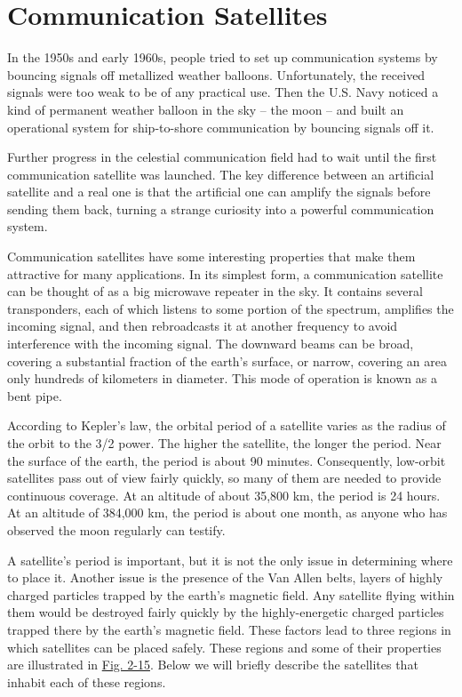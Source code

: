 \protect\hypertarget{0130661023_ch02lev1sec4.htmlux5cux23ch02lev1sec4}{}{}

\section{Communication Satellites}

In the 1950s and early 1960s, people tried to set up communication
systems by bouncing signals off metallized weather balloons.
Unfortunately, the received signals were too weak to be of any practical
use. Then the U.S. Navy noticed a kind of permanent weather balloon in
the sky -- the moon -- and built an operational system for ship-to-shore
communication by bouncing signals off it.

Further progress in the celestial communication field had to wait until
the first communication satellite was launched. The key difference
between an artificial satellite and a real one is that the artificial
one can amplify the signals before sending them back, turning a strange
curiosity into a powerful communication system.

Communication satellites have some interesting properties that make them
attractive for many applications. In its simplest form, a communication
satellite can be thought of as a big microwave repeater in the sky. It
contains several {transponders}, each of which listens to some portion
of the spectrum, amplifies the incoming signal, and then rebroadcasts it
at another frequency to avoid interference with the incoming signal. The
downward beams can be broad, covering a substantial fraction of the
earth's surface, or narrow, covering an area only hundreds of kilometers
in diameter. This mode of operation is known as a {bent pipe}.

According to Kepler's law, the orbital period of a satellite varies as
the radius of the orbit to the 3/2 power. The higher the satellite, the
longer the period. Near the surface of the earth, the period is about 90
minutes. Consequently, low-orbit satellites pass out of view fairly
quickly, so many of them are needed to provide continuous coverage. At
an altitude of about 35,800 km, the period is 24 hours. At an altitude
of 384,000 km, the period is about one month, as anyone who has observed
the moon regularly can testify.

A satellite's period is important, but it is not the only issue in
determining where to place it. Another issue is the presence of the Van
Allen belts, layers of highly charged particles trapped by the earth's
magnetic field. Any satellite flying within them would be destroyed
fairly quickly by the highly-energetic charged particles trapped there
by the earth's magnetic field. These factors lead to three regions in
which satellites can be placed safely. These regions and some of their
properties are illustrated in
\protect\hyperlink{0130661023_ch02lev1sec4.htmlux5cux23ch02fig15}{Fig.
2-15}. Below we will briefly describe the satellites that inhabit each
of these regions.

